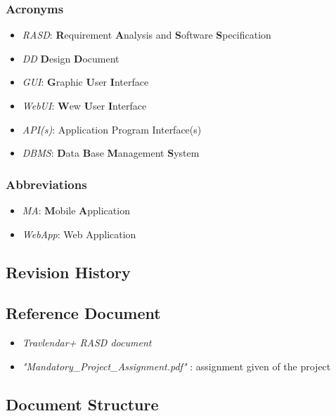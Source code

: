 \subsubsection{Acronyms}
\begin{itemize}
	\item \textsl{RASD}: \textbf{R}equirement \textbf{A}nalysis and \textbf{S}oftware \textbf{S}pecification
	\item \textsl{DD} \textbf{D}esign \textbf{D}ocument
	\item \textsl{GUI}: \textbf{G}raphic \textbf{U}ser \textbf{I}nterface
	\item \textsl{WebUI}: \textbf{W}ew \textbf{U}ser \textbf{I}nterface
	\item \textsl{API(s)}: Application Program Interface(s)
	\item \textsl{DBMS}: \textbf{D}ata \textbf{B}ase \textbf{M}anagement \textbf{S}ystem
\end{itemize}
\subsubsection{Abbreviations}
\begin{itemize}
	\item \textsl{MA}: \textbf{M}obile \textbf{A}pplication
	\item \textsl{WebApp}: Web Application
	
\end{itemize}

\subsection{Revision History}


\subsection{Reference Document}

\begin{itemize}
	\item \textsl{Travlendar+ RASD document}
	\item \textsl{"Mandatory\_Project\_Assignment.pdf" }: assignment given of the project
	
\end{itemize}

\subsection{Document Structure}



